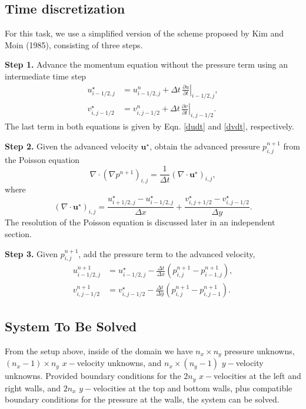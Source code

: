 \documentclass[11pt]{article}
\newcommand{\ind}[4]{{#1}^{#2}_{#3,#4}}
\begin{document}
\subsection{Time discretization}

For this task, we use a simplified version of the scheme proposed by Kim and Moin (1985), consisting of three steps.

\textbf{Step 1.} Advance the momentum equation without the pressure term using an intermediate time step
\begin{align}
\ind{u}{\star}{i-1/2}{j} &= \ind{u}{n}{i-1/2}{j} + \Delta t\,\left.\frac{\partial u}{\partial t}\right|_{i-1/2,j},\\
\ind{v}{\star}{i}{j-1/2} &= \ind{v}{n}{i}{j-1/2} + \Delta t\,\left.\frac{\partial v}{\partial t}\right|_{i,j-1/2}.
\end{align}
The last term in both equations is given by Eqn. \eqref{dudt} and \eqref{dvdt}, respectively. 

\textbf{Step 2.} Given the advanced velocity $\mathbf u^\star$, obtain the advanced pressure $\ind{p}{n+1}{i}{j}$ from the Poisson equation
\begin{equation}
\nabla\cdot(\nabla p^{n+1})_{i,j} = \frac{1}{\Delta t}\left(\nabla\cdot\mathbf u^\star\right)_{i,j},
\end{equation}
where 
\begin{equation}
\left(\nabla\cdot\mathbf u^\star\right)_{i,j} = \frac{u^\star_{i+1/2,j} - u^\star_{i-1/2,j}}{\Delta x} + \frac{v^\star_{i,j+1/2} - v^\star_{i,j-1/2}}{\Delta y}.
\end{equation}
The resolution of the Poisson equation is discussed later in an independent section.

\textbf{Step 3.} Given $\ind{p}{n+1}{i}{j}$, add the pressure term to the advanced velocity,
\begin{align}
\ind{u}{n+1}{i-1/2}{j} &= \ind{u}{\star}{i-1/2}{j} - \frac{\Delta t}{\Delta x}\left(\ind{p}{n+1}{i}{j} - \ind{p}{n+1}{i-1}{j} \right),\\
\ind{v}{n+1}{i}{j-1/2} &= \ind{v}{\star}{i}{j-1/2} - \frac{\Delta t}{\Delta y}\left(\ind{p}{n+1}{i}{j} - \ind{p}{n+1}{i}{j-1} \right).
\end{align}

\subsection{System To Be Solved}

From the setup above, inside of the domain we have $n_x\times n_y$ pressure unknowns, $(n_x - 1)\times n_y$ $x-$velocity unknowns, and $n_x\times(n_y - 1)$ $y-$velocity unknowns. Provided boundary conditions for the $2n_y$ $x-$velocities at the left and right walls, and $2n_x$ $y-$velocities at the top and bottom walls, plus compatible boundary conditions for the pressure at the walls, the system can be solved.
\end{document}
